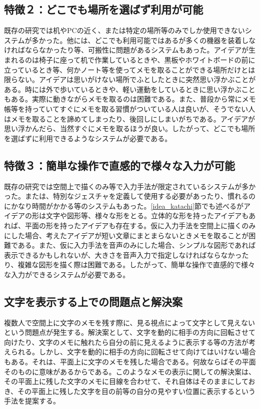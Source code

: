 \documentclass[11pt,a4j, titlepage]{jarticle} %
\begin{document}
\subsection*{特徴２：どこでも場所を選ばず利用が可能}
既存の研究では机やPCの近く、または特定の場所等のみでしか使用できないシステムが多かった。他には、どこでも利用可能ではあるが多くの機器を装着しなければならなかったり等、可搬性に問題があるシステムもあった。アイデアが生まれるのは椅子に座って机で作業しているときや、黒板やホワイトボードの前に立っているとき等、何かノート等を使ってメモを取ることができる場所だけとは限らない。アイデアは思いがけない場所でふとしたときに突然思い浮かぶことがある。時には外で歩いているときや、軽い運動をしているときに思い浮かぶこともある。実際に動きながらメモを取るのは困難である。また、普段から常にメモ帳等を持っていてすぐにメモを取る習慣がついている人は良いが、そうでない人はメモを取ることを諦めてしまったり、後回しにしまいがちである。アイデアが思い浮かんだら、当然すぐにメモを取るほうが良い。したがって、どこでも場所を選ばずに利用できるようなシステムが必要である。

\subsection*{特徴３：簡単な操作で直感的で様々な入力が可能}
既存の研究では空間上で描くのみ等で入力手法が限定されているシステムが多かった。または、特別なジェスチャを定義して使用する必要があったり、慣れるのにかなり時間がかかる等のシステムもあった。\ref{idea_katachi}節でも述べるがアイデアの形は文字や図形等、様々な形をとる。立体的な形を持ったアイデアもあれば、平面の形を持ったアイデアも存在する。仮に入力手法を空間上に描くのみにした場合、考えたアイデアが短い文章にまとまらないときメモを取ることが困難である。また、仮に入力手法を音声のみにした場合、シンプルな図形であれば表示できるかもしれないが、大きさを音声入力で指定しなければならなかったり、複雑な図形を描く際は困難である。したがって、簡単な操作で直感的で様々な入力ができるシステムが必要である。

\subsection{文字を表示する上での問題点と解決案} \label{moji_mondai}
複数人で空間上に文字のメモを残す際に、見る視点によって文字として見えないという問題点が発生する。解決案として、文字を動的に相手の方向に回転させて向けたり、文字のメモに触れたら自分の前に見えるように表示する等の方法が考えられる。しかし、文字を動的に相手の方向に回転させて向けてはいけない場合もある。それは、平面上に文字のメモを残した場合である。何故ならばその平面そのものに意味があるからである。このようなメモの表示に関しての解決案は、その平面上に残した文字のメモに目線を合わせて、それ自体はそのままにしておき、その平面上に残した文字を目の前等の自分の見やすい位置に表示するという手法を提案する。
\end{document}
